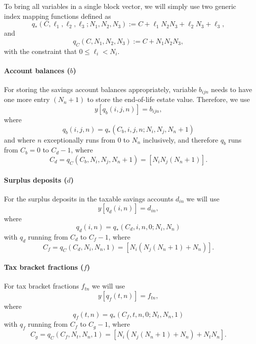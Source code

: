 \documentclass{report}[fleqn,11pt]
\begin{document}
To bring all variables in a single block vector,
we will simply use two generic index mapping functions defined as
\begin{equation}
	q_*(C, \ell_1, \ell_2, \ell_3 ; N_1, N_2, N_3) :=
	C + \ell_1N_2N_3 + \ell_2N_3 + \ell_3 ,
\end{equation}
and
\begin{equation}
	q_C(C, N_1, N_2, N_3) :=
	C + N_1N_2N_3,
\end{equation}
with the constraint that $0 \le \ell_i < N_i$.

\paragraph*{Account balances (\boldmath$b$)}
For storing the savings account balances appropriately, variable $b_{ijn}$ needs to have one
more entry $(N_n + 1)$ to
store the end-of-life estate value. Therefore, we use
\begin{equation}
	y[q_b(i, j, n)] = b_{ijn},
\end{equation}
where
\begin{equation}
	\label{Eq:Extra}
	q_b(i, j, n) = q_*(C_b, i, j, n; N_i, N_j, N_n+1)
\end{equation}
and where $n$ exceptionally runs from 0 to $N_n$ inclusively, and therefore
$q_b$ runs from $C_b = 0$ to $C_{d} - 1$,
where
\[
	C_{d} = q_C(C_b, N_i, N_j, N_n+1) = [N_i N_j (N_n+1)].
\]

\paragraph*{Surplus deposits (\boldmath$d$)}
For the surplus deposits in the taxable savings accounts $d_{in}$ we will use
\begin{equation}
	y[q_d(i, n)] = d_{in},
\end{equation}
where
\begin{equation}
	q_d(i, n) = q_*(C_d, i, n, 0; N_i, N_n)
\end{equation}
with $q_d$ running from $C_d$ to $C_f - 1$, where
\[
	C_f = q_C(C_d, N_i, N_n, 1) = [N_i(N_j(N_n+1) + N_n)].
\]

\paragraph*{Tax bracket fractions (\boldmath$f$)}
For tax bracket fractions $f_{t n}$ we will use
\begin{equation}
	y[q_f(t, n)] = f_{t n},
\end{equation}
where
\begin{equation}
	q_f(t, n) = q_*(C_f, t, n, 0; N_t, N_n, 1)
\end{equation}
with $q_f$ running from $C_f$ to $C_g - 1$, where
\[
	C_g = q_C(C_f, N_t, N_n, 1) = [N_i(N_j(N_n+1) + N_n) + N_tN_n].
\]
\end{document}

